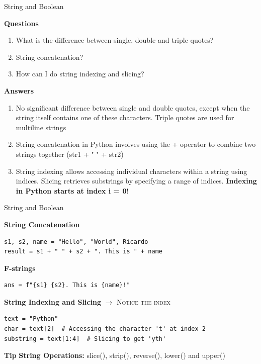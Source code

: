\documentclass[
	11pt, 
]{beamer}
\begin{document}

\begin{frame}{String and Boolean}

\begin{block}{\textbf{Questions}}
\begin{enumerate}
    \item What is the difference between single, double and triple quotes?
    \item String concatenation?
    \item How can I do string indexing and slicing?
\end{enumerate}
\end{block}

\pause

\textbf{Answers}
\begin{enumerate}
    \item No significant difference between single and double quotes, except when the string itself contains one of these characters. Triple quotes are used for multiline strings
    \item String concatenation in Python involves using the + operator to combine two strings together (str1 + " " + str2)
    \item String indexing allows accessing individual characters within a string using indices. Slicing retrieves substrings by specifying a range of indices. \textbf{Indexing in Python starts at index i = 0!}
\end{enumerate}
    
\end{frame}



\begin{frame}[fragile]{String and Boolean}
\small %
 
\textbf{String Concatenation}   
\begin{verbatim}
s1, s2, name = "Hello", "World", Ricardo
result = s1 + " " + s2 + ". This is " + name 
\end{verbatim}

\textbf{F-strings}   
\begin{verbatim}
ans = f"{s1} {s2}. This is {name}!"
\end{verbatim}

\textbf{String Indexing and Slicing}
\hfill \textsc{$\rightarrow$ Notice the index}

\begin{verbatim}
text = "Python"
char = text[2]  # Accessing the character 't' at index 2
substring = text[1:4]  # Slicing to get 'yth'
\end{verbatim}


\begin{exampleblock}{\textbf{Tip}}
    \textbf{String Operations:} slice(), strip(), reverse(), lower() and upper()
\end{exampleblock}

\end{frame}
\end{document}
